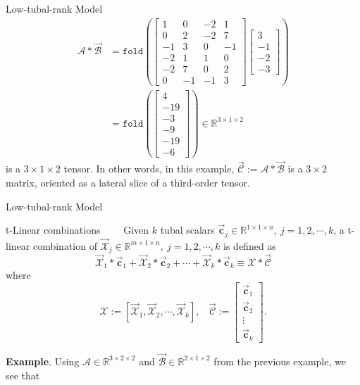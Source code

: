 \documentclass[t, 10pt, handout, aspectratio=169]{beamer}
\begin{document}
\begin{frame}{Low-tubal-rank Model}
$$
\begin{aligned}
\mathcal{A}*\vec{\mathcal{B}} & =\texttt{fold}\left(
\left[\begin{array}{cc|cc}
1 & 0 & -2 & 1\\
0 & 2 & -2 & 7\\
-1 & 3 & 0 & -1\\
\hline
-2 & 1 & 1 & 0\\
-2 & 7 & 0 & 2\\
0 & -1 & -1 & 3
\end{array}\right]
\left[\begin{array}{c}
3\\
-1\\
\hline
-2\\
-3
\end{array}\right]
\right)\\
& = \texttt{fold}\left(
\left[\begin{array}{c}
4\\
-19\\
-3\\
\hline
-9\\
-19\\
-6
\end{array}\right]
\right)\in\mathbb{R}^{3\times 1 \times 2}
\end{aligned}
$$
is a $3 \times 1 \times 2$ tensor. In other words, in this example, $\vec{\mathcal{C}} := \mathcal{A} * \vec{\mathcal{B}}$ is a $3\times 2$ matrix, oriented as a lateral slice of a third-order tensor.
\end{frame}

\begin{frame}{Low-tubal-rank Model}
\begin{block}{t-Linear combinations}
~~~~Given $k$ tubal scalars $\vec{\mathbf{c}}_j\in\mathbb{R}^{1\times 1\times n},~j=1,2,\cdots,k$, a t-linear combination of $\vec{\mathcal{X}}_j\in \mathbb{R}^{m\times 1\times n},~j=1,2,\cdots,k$ is defined as
$$
\vec{\mathcal{X}}_1*\vec{\mathbf{c}}_1 + \vec{\mathcal{X}}_2 * \vec{\mathbf{c}}_2 + \cdots + \vec{\mathcal{X}}_k * \vec{\mathbf{c}}_k \equiv \mathcal{X} * \vec{\mathcal{C}}
$$
where
$$
\mathcal{X} := \left[\vec{\mathcal{X}}_1, \vec{\mathcal{X}}_2, \cdots, \vec{\mathcal{X}}_k\right],~~~~\vec{\mathcal{C}}:=\left[\begin{matrix}
\vec{\mathbf{c}}_1\\
\vec{\mathbf{c}}_2\\
\vdots\\
\vec{\mathbf{c}}_k
\end{matrix}\right].
$$
\end{block}
\textbf{Example}. Using $\mathcal{A}\in\mathbb{R}^{3\times 2 \times 2}$ and $\vec{\mathcal{B}}\in\mathbb{R}^{2\times 1\times 2}$ from the previous example, we see that

\end{frame}
\end{document}
